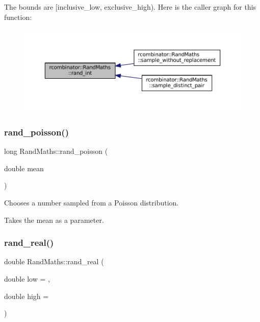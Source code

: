 The bounds are \mbox{[}inclusive\+\_\+low, exclusive\+\_\+high). Here is the caller graph for this function\+:
\nopagebreak
\begin{figure}[H]
\begin{center}
\leavevmode
\includegraphics[width=350pt]{classrcombinator_1_1RandMaths_ae417da209eb8a9d1b2217e7a5397926c_icgraph}
\end{center}
\end{figure}
\mbox{\label{classrcombinator_1_1RandMaths_a1fec117f0ebd5a7834fdcf649a23edd7}} 
\subsubsection{\texorpdfstring{rand\+\_\+poisson()}{rand\_poisson()}}
{\footnotesize\ttfamily long Rand\+Maths\+::rand\+\_\+poisson (\begin{DoxyParamCaption}\item[{double}]{mean }\end{DoxyParamCaption})}



Chooses a number sampled from a Poisson distribution. 

Takes the mean as a parameter. \mbox{\label{classrcombinator_1_1RandMaths_aa6441baa59bff50f588c0c54e3c54140}} 
\subsubsection{\texorpdfstring{rand\+\_\+real()}{rand\_real()}}
{\footnotesize\ttfamily double Rand\+Maths\+::rand\+\_\+real (\begin{DoxyParamCaption}\item[{double}]{low = {},  }\item[{double}]{high = {} }\end{DoxyParamCaption})}



